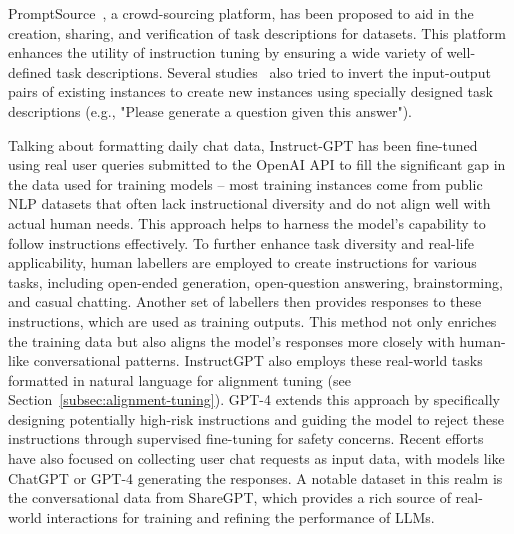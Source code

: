 PromptSource~\cite{bach2022promptsource}, a crowd-sourcing platform, has been proposed to aid in the creation, sharing, and verification of task descriptions for datasets.
This platform enhances the utility of instruction tuning by ensuring a wide variety of well-defined task descriptions.
Several studies~\cite{sanhetal2022multitask, tang2022mvp, longpre2023flan} also tried to invert the input-output pairs of existing instances to create new instances using specially designed task descriptions (e.g., "Please generate a question given this answer").

Talking about formatting daily chat data, Instruct-GPT has been fine-tuned using real user queries submitted to the OpenAI API to fill the significant gap in the data used for training models -- most training instances come from public NLP datasets that often lack instructional diversity and do not align well with actual human needs.
This approach helps to harness the model's capability to follow instructions effectively.
To further enhance task diversity and real-life applicability, human labellers are employed to create instructions for various tasks, including open-ended generation, open-question answering, brainstorming, and casual chatting.
Another set of labellers then provides responses to these instructions, which are used as training outputs.
This method not only enriches the training data but also aligns the model's responses more closely with human-like conversational patterns.
InstructGPT also employs these real-world tasks formatted in natural language for alignment tuning (see Section~\ref{subsec:alignment-tuning}).
GPT-4 extends this approach by specifically designing potentially high-risk instructions and guiding the model to reject these instructions through supervised fine-tuning for safety concerns.
Recent efforts have also focused on collecting user chat requests as input data, with models like ChatGPT or GPT-4 generating the responses.
A notable dataset in this realm is the conversational data from ShareGPT, which provides a rich source of real-world interactions for training and refining the performance of LLMs.

